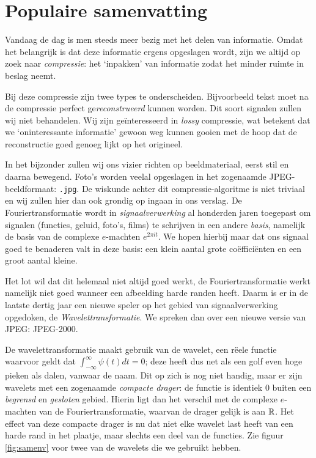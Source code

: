 \chapter{Populaire samenvatting}

\vspace{-3pt}
Vandaag de dag is men steeds meer bezig met het delen van informatie. Omdat het belangrijk is dat deze informatie ergens opgeslagen wordt, zijn we altijd op zoek naar \emph{compressie}: het `inpakken' van informatie zodat het minder ruimte in beslag neemt.

Bij deze compressie zijn twee types te onderscheiden. Bijvoorbeeld tekst moet na de compressie perfect ge\emph{reconstrueerd} kunnen worden. Dit soort signalen zullen wij niet behandelen. Wij zijn ge\"interesseerd in \emph{lossy} compressie, wat betekent dat we `oninteressante informatie' gewoon weg kunnen gooien met de hoop dat de reconstructie goed genoeg lijkt op het origineel.

In het bijzonder zullen wij ons vizier richten op beeldmateriaal, eerst stil en daarna bewegend. Foto's worden veelal opgeslagen in het zogenaamde JPEG-beeldformaat: \texttt{.jpg}. De wiskunde achter dit compressie-algoritme is niet triviaal en wij zullen hier dan ook grondig op ingaan in ons verslag. De Fouriertransformatie wordt in \emph{signaalverwerking} al honderden jaren toegepast om signalen (functies, geluid, foto's, films) te schrijven in een andere \emph{basis}, namelijk de basis van de complexe $e$-machten $e^{2 \pi i t}$. We hopen hierbij maar dat ons signaal goed te benaderen valt in deze basis: een klein aantal grote co\"effici\"enten en een groot aantal kleine.

Het lot wil dat dit helemaal niet altijd goed werkt, de Fouriertransformatie werkt namelijk niet goed wanneer een afbeelding harde randen heeft.
Daarm is er in de laatste dertig jaar een nieuwe speler op het gebied van signaalverwerking opgedoken, de \mbox{\emph{Wavelettransformatie}}. 
We spreken dan over een nieuwe versie van JPEG: JPEG-2000.

De wavelettransformatie maakt gebruik van de wavelet, een r\"eele functie waarvoor geldt dat $\int_{-\infty}^\infty \psi(t) dt = 0$;
deze heeft dus net als een golf even hoge pieken als dalen, vanwaar de naam.
Dit op zich is nog niet handig, maar er zijn wavelets met een zogenaamde \emph{compacte drager}:
de functie is identiek $0$ buiten een \emph{begrensd} en \emph{gesloten} gebied. 
Hierin ligt dan het verschil met de complexe $e$-machten van de Fouriertransformatie, waarvan de drager gelijk is aan $\mathbb{R}$. 
Het effect van deze compacte drager is nu dat niet elke wavelet last heeft van een harde rand in het plaatje, maar slechts een deel van de functies.
Zie figuur \ref{fig:samenv} voor twee van de wavelets die we gebruikt hebben.

